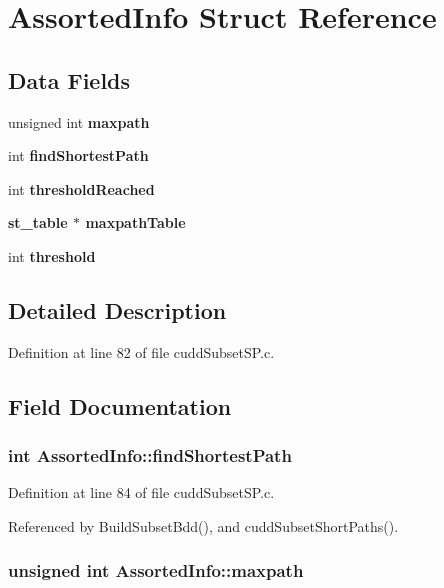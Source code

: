 \section{Assorted\-Info Struct Reference}
\label{structAssortedInfo}
\subsection*{Data Fields}
\begin{CompactItemize}
\item 
unsigned int \bf{maxpath}
\item 
int \bf{find\-Shortest\-Path}
\item 
int \bf{threshold\-Reached}
\item 
\bf{st\_\-table} $\ast$ \bf{maxpath\-Table}
\item 
int \bf{threshold}
\end{CompactItemize}


\subsection{Detailed Description}




Definition at line 82 of file cudd\-Subset\-SP.c.

\subsection{Field Documentation}
\subsubsection{\setlength{\rightskip}{0pt plus 5cm}int \bf{Assorted\-Info::find\-Shortest\-Path}}\label{structAssortedInfo_ad4cc09ed435741e2c483c3318c87999}




Definition at line 84 of file cudd\-Subset\-SP.c.

Referenced by Build\-Subset\-Bdd(), and cudd\-Subset\-Short\-Paths().
\subsubsection{\setlength{\rightskip}{0pt plus 5cm}unsigned int \bf{Assorted\-Info::maxpath}}\label{structAssortedInfo_5a72c54fb00d73eff856dc9f9f7859f6}





